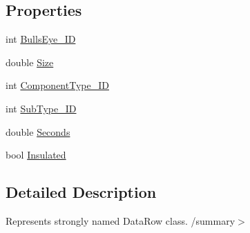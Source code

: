 \subsection*{Properties}
\begin{DoxyCompactItemize}
\item 
int \hyperlink{class_env_int_1_1_win32_1_1_field_tech_1_1_manager_1_1_data_sets_1_1_guide_ware_mobile_data_set_1_1_bulls_eye_row_a2657e44df2b9b31b3fd20960e87d2759}{Bulls\+Eye\+\_\+\+I\+D}
\item 
double \hyperlink{class_env_int_1_1_win32_1_1_field_tech_1_1_manager_1_1_data_sets_1_1_guide_ware_mobile_data_set_1_1_bulls_eye_row_a402c8e56938bfe6ea0dc4703d4daefd1}{Size}
\item 
int \hyperlink{class_env_int_1_1_win32_1_1_field_tech_1_1_manager_1_1_data_sets_1_1_guide_ware_mobile_data_set_1_1_bulls_eye_row_a13b85432f78b89992dc63206f8f37bf6}{Component\+Type\+\_\+\+I\+D}
\item 
int \hyperlink{class_env_int_1_1_win32_1_1_field_tech_1_1_manager_1_1_data_sets_1_1_guide_ware_mobile_data_set_1_1_bulls_eye_row_a923648a9e0803a6672fc927fb5bdccb5}{Sub\+Type\+\_\+\+I\+D}
\item 
double \hyperlink{class_env_int_1_1_win32_1_1_field_tech_1_1_manager_1_1_data_sets_1_1_guide_ware_mobile_data_set_1_1_bulls_eye_row_a7d3805fa584f66a25c5beb4a096b0b94}{Seconds}
\item 
bool \hyperlink{class_env_int_1_1_win32_1_1_field_tech_1_1_manager_1_1_data_sets_1_1_guide_ware_mobile_data_set_1_1_bulls_eye_row_aef5d9f46d0ffa25c6a61049ab2ae2a91}{Insulated}
\end{DoxyCompactItemize}


\subsection{Detailed Description}
Represents strongly named Data\+Row class. /summary$>$ 

